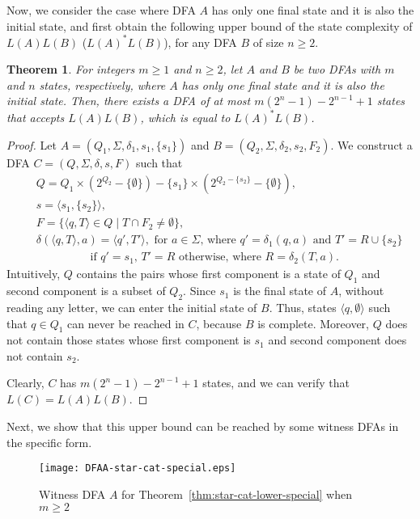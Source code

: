 \documentclass[10pt]{article}
\newtheorem{theorem}{Theorem}
\begin{document}
Now, we consider the case where DFA $A$ has only one final state and it is also the initial state, and first obtain the following upper bound of the state complexity of $L(A)L(B)$ ($L(A)^*L(B)$), for any DFA $B$ of size $n \ge 2$.
\begin{theorem}\label{thm:star-cat-upper-special}
For integers $m \ge 1$ and $n \ge 2$, let $A$ and $B$ be two DFAs with $m$ and $n$ states, respectively, where $A$ has only one final state and it is also the initial state.
Then, there exists a DFA of at most $m(2^n-1) - 2^{n-1} + 1$ states that accepts $L(A)L(B)$, which is equal to $L(A)^*L(B)$.
\end{theorem}
\begin{proof}
Let $A = (Q_1, \Sigma, \delta_1, s_1, \{s_1\})$ and $B = (Q_2, \Sigma, \delta_2, s_2, F_2)$.
We construct a DFA $C = (Q, \Sigma, \delta, s, F)$ such that
\begin{eqnarray*}
    & & Q = Q_1 \times ( 2^{Q_2} - \{ \emptyset \}) - \{s_1\} \times ( 2^{Q_2 - \{s_2\}} - \{\emptyset\}), \\
    & & s = \langle s_1, \{ s_2 \} \rangle, \\
    & & F = \{ \langle q, T \rangle \in Q \mid T \cap F_2 \neq \emptyset \}, \\
    & & \delta(\langle q, T \rangle, a) = \langle q', T' \rangle,
            \mbox{ for $a \in \Sigma$, where $q' = \delta_1(q, a)$ and $T' = R \cup \{s_2\}$} \\
    & & \hspace{2cm}  \mbox{if $q' = s_1$, $T' = R$ otherwise, where $R = \delta_2(T,a)$.}
\end{eqnarray*}
Intuitively, $Q$ contains the pairs whose first component is a state of $Q_1$ and second component is a subset of $Q_2$.
Since $s_1$ is the final state of $A$, without reading any letter, we can enter the initial state of $B$.
Thus, states $\langle q, \emptyset \rangle$ such that $q \in Q_1$ can never be reached in $C$, because $B$ is complete.
Moreover, $Q$ does not contain those states whose first component is $s_1$ and second component does not contain $s_2$.

Clearly, $C$ has $m(2^n-1) - 2^{n-1} + 1$ states, and we can verify that $L(C) = L(A)L(B)$.
\end{proof}

Next, we show that this upper bound can be reached by some witness DFAs in the specific form.

\begin{figure}[ht]
  \begin{center}
  \texttt{[image: DFAA-star-cat-special.eps]}
  \end{center}
  \caption{Witness DFA $A$ for Theorem~\ref{thm:star-cat-lower-special} when $m \ge 2$}
\label{fig:DFAA-star-cat-special}
\end{figure}
\end{document}
